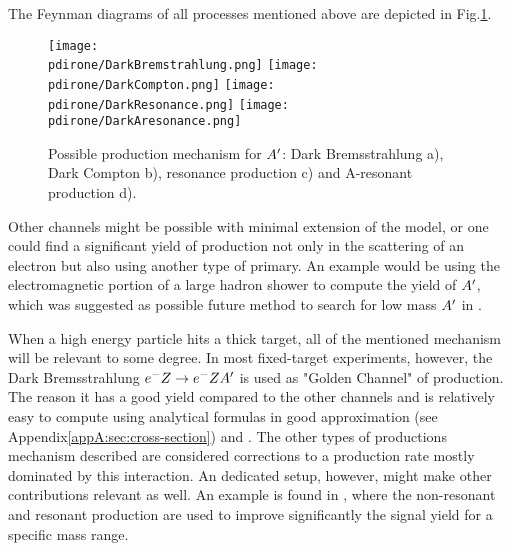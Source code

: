 The Feynman diagrams of all processes mentioned above are depicted in Fig.\ref{fig:dm-production-mechanism}.

\begin{figure}
\centering
\texttt{[image: \\pdirone/DarkBremstrahlung.png]}
\texttt{[image: \\pdirone/DarkCompton.png]}
\texttt{[image: \\pdirone/DarkResonance.png]}
\texttt{[image: \\pdirone/DarkAresonance.png]}
\caption{Possible production mechanism for $A'$: Dark Bremsstrahlung a), Dark Compton b), resonance production c) and A-resonant production d).}
\label{fig:dm-production-mechanism}
\end{figure}

Other channels might be possible with minimal extension of the model, or one could find a significant yield of production not only in the scattering of an electron but also using another type of primary. An example would be using the electromagnetic portion of a large hadron shower to compute the yield of $A'$, which was suggested as possible future method to search for low mass $A'$ in \cite{Celentano:2020vtu}.

When a high energy particle hits a thick target, all of the mentioned mechanism will be relevant to some degree. %
In most fixed-target experiments, however, the Dark Bremsstrahlung $e^- Z \to e^- Z A'$ is used as "Golden Channel" of production. The reason it has a good yield compared to the other channels and is relatively easy to compute using analytical formulas in good approximation (see Appendix\ref{appA:sec:cross-section}) and . The other types of productions mechanism described are considered corrections to a production rate mostly dominated by this interaction. An dedicated setup, however, might make other contributions relevant as well. An example is found in \cite{Marsicano_2018}, where the non-resonant and resonant production are used to improve significantly the signal yield for a specific mass range.

